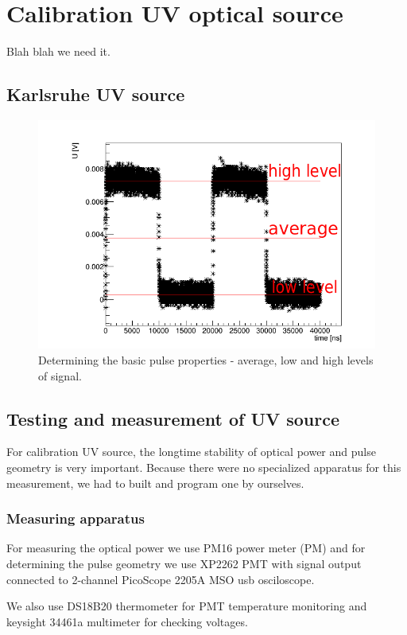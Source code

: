 
\chapter{Calibration UV optical source}
Blah blah we need it.
\section{Karlsruhe UV source}


 \begin{figure}[H]
 \centering
 \includegraphics[scale=0.65]{./pictures/PMTPulse}
 \caption{Determining the basic pulse properties - average, low and high levels of signal.}
 \label{pulse}
\end{figure}


\section{Testing and measurement of UV source}
For calibration UV source, the longtime stability of optical power and pulse geometry is very important. Because there were no specialized apparatus for this measurement, we had to built and program one by ourselves.
\subsection{Measuring apparatus}
For measuring the optical power we use PM16 power meter (PM) and for determining the pulse geometry we use XP2262 PMT with signal output connected to 2-channel PicoScope 2205A MSO usb osciloscope.
\par
We also use DS18B20 thermometer for PMT temperature monitoring and keysight 34461a multimeter for checking voltages.


